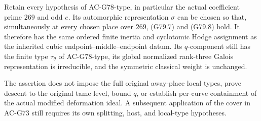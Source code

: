 \begin{theorem}
\label{thm:G79}
Retain every hypothesis of AC-G78-type, in particular
the actual coefficient prime \(269\) and odd \(e\).
Its automorphic representation \(\sigma\) can be chosen
so that, simultaneously at every chosen place over
\(269\), (G79.7) and (G79.8) hold.
It therefore has the same ordered finite inertia and
cyclotomic Hodge assignment as the inherited cubic
endpoint--middle--endpoint datum.
Its \(q\)-component still has the finite type
\(\tau_\theta\) of AC-G78-type, its global normalized
rank-three Galois representation is irreducible, and
the symmetric classical weight is unchanged.

The assertion does not impose the full original
away-place local types, prove descent to the original
tame level, bound \(q\), or establish per-curve containment
of the actual modified deformation ideal.
A subsequent application of the cover in AC-G73 still
requires its own splitting, host, and local-type hypotheses.
\end{theorem}

